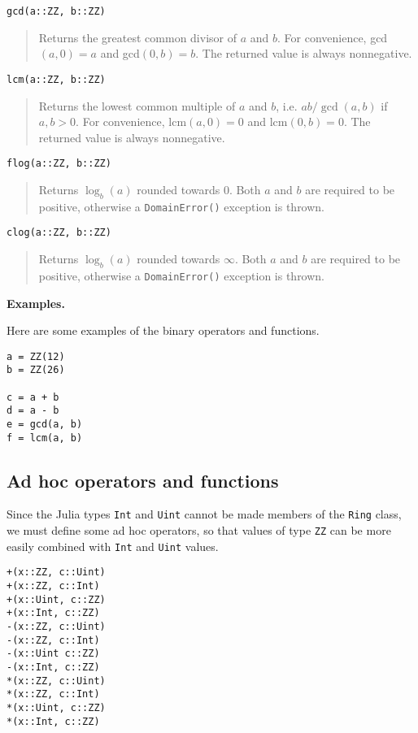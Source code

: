 \documentclass[a4paper,10pt]{article}
\newcommand{\code}{\lstinline}
\newcommand{\desc}[1]{\vspace{-3mm}\begin{quote}#1\end{quote}}
\begin{document}
{{{\begin{lstlisting}
gcd(a::ZZ, b::ZZ)
\end{lstlisting}

\desc{Returns the greatest common divisor of $a$ and $b$. For convenience, 
gcd$(a, 0) = a$ and gcd$(0, b) = b$. The returned value is always nonnegative.}

\begin{lstlisting}
lcm(a::ZZ, b::ZZ)
\end{lstlisting}

\desc{Returns the lowest common multiple of $a$ and $b$, i.e. $ab/\gcd(a, b)$ if
$a, b > 0$. For convenience, lcm$(a, 0) = 0$ and lcm$(0, b) = 0$. The returned
value is always nonnegative.}

\begin{lstlisting}
flog(a::ZZ, b::ZZ)
\end{lstlisting}

\desc{Returns $\log_b(a)$ rounded towards $0$. Both $a$ and $b$ are required
to be positive, otherwise a \code{DomainError()} exception is thrown.}

\begin{lstlisting}
clog(a::ZZ, b::ZZ)
\end{lstlisting}

\desc{Returns $\log_b(a)$ rounded towards $\infty$. Both $a$ and $b$ are required
to be positive, otherwise a \code{DomainError()} exception is thrown.}

\textbf{Examples.}

Here are some examples of the binary operators and functions.

\begin{lstlisting}
a = ZZ(12)
b = ZZ(26)

c = a + b
d = a - b
e = gcd(a, b)
f = lcm(a, b)
\end{lstlisting}

\subsection{Ad hoc operators and functions}

Since the Julia types \code{Int} and \code{Uint} cannot be made members of the
\code{Ring} class, we must define some ad hoc operators, so that values of type
\code{ZZ} can be more easily combined with \code{Int} and \code{Uint} values.

\begin{lstlisting}
+(x::ZZ, c::Uint)
+(x::ZZ, c::Int)
+(x::Uint, c::ZZ)
+(x::Int, c::ZZ)
-(x::ZZ, c::Uint)
-(x::ZZ, c::Int)
-(x::Uint c::ZZ)
-(x::Int, c::ZZ)
*(x::ZZ, c::Uint)
*(x::ZZ, c::Int)
*(x::Uint, c::ZZ)
*(x::Int, c::ZZ)
\end{lstlisting}

}}}
\end{document}
